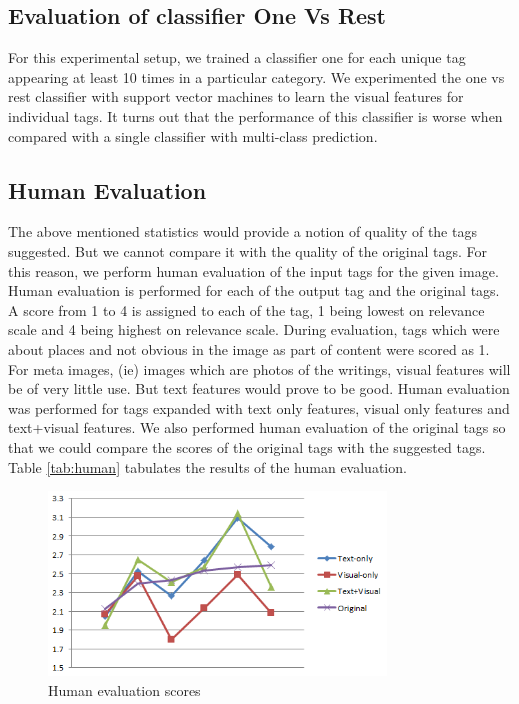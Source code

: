 \documentclass[12pt]{article}
\begin{document}
\subsection{Evaluation of classifier One Vs Rest}
For this experimental setup, we trained a classifier one for each unique tag appearing at least
10 times in a particular category. We experimented the one vs rest classifier with support vector
machines to learn the visual features for individual tags. It turns out that the performance of
this classifier is worse when compared with a single classifier with multi-class prediction.

\subsection{Human Evaluation}
The above mentioned statistics would provide a notion of quality of the tags suggested. But
we cannot compare it with the quality of the original tags. For this reason, we perform human
evaluation of the input tags for the given image. Human evaluation is performed for each of the
output tag and the original tags. A score from 1 to 4 is assigned to each of the tag, 1 being
lowest on relevance scale and 4 being highest on relevance scale. During evaluation, tags which
were about places and not obvious in the image as part of content were scored as 1. For meta images,
(ie) images which are photos of the writings, visual features will be of very little use. But
text features would prove to be good. Human evaluation was performed for tags expanded with
text only features, visual only features and text+visual features. We also performed human
evaluation of the original tags so that we could compare the scores of the original tags with
the suggested tags. Table \ref{tab:human} tabulates the results of the human evaluation.

\begin{figure}[t]
\label{fig:graph}
\caption{Human evaluation scores}
\begin{center}
\includegraphics[width=0.8\textwidth]{humanEvalGraph.png}
\end{center}
\end{figure}
\end{document}
